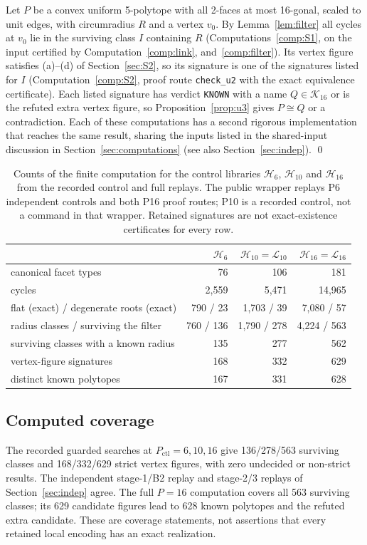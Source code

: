 \documentclass[11pt]{article}
\theoremstyle{definition}
\theoremstyle{remark}
\begin{document}
Let $P$ be a convex uniform 5-polytope with all 2-faces at most 16-gonal,
scaled to unit edges, with circumradius $R$ and a vertex $v_0$. By
Lemma~\ref{lem:filter} all cycles at $v_0$ lie in the surviving class $I$
containing $R$ (Computations~\ref{comp:S1}, on the input certified by
Computation~\ref{comp:link}, and~\ref{comp:filter}). Its vertex figure
satisfies (a)--(d) of Section~\ref{sec:S2}, so its signature is one of the
signatures listed for $I$ (Computation~\ref{comp:S2}, proof route
\texttt{check\_u2} with the exact equivalence certificate). Each listed
signature has verdict \texttt{KNOWN} with a name $Q\in\mathcal K_{16}$ or
is the refuted extra vertex figure, so Proposition~\ref{prop:u3} gives
$P\cong Q$ or a contradiction. Each of these computations
has a second rigorous implementation that reaches the same result, sharing
the inputs listed in the shared-input discussion in Section~\ref{sec:computations}
(see also Section~\ref{sec:indep}). \qed

\begin{table}[ht]
\centering\small
\caption{Counts of the finite computation for the control libraries
$\mathcal H_6$, $\mathcal H_{10}$ and $\mathcal H_{16}$
from the recorded control and full replays. The public wrapper replays
P6 independent controls and both P16 proof routes; P10 is a recorded
control, not a command in that wrapper. Retained signatures are not
exact-existence certificates for every row.}
\label{tab:counts}
\begin{tabular}{@{}lrrr@{}}
\toprule
 & $\mathcal H_6$ & $\mathcal H_{10}=\mathcal L_{10}$ & $\mathcal H_{16}=\mathcal L_{16}$\\
\midrule
canonical facet types & 76 & 106 & 181\\
cycles & 2,559 & 5,471 & 14,965\\
\quad flat (exact) / degenerate roots (exact) & 790 / 23 & 1,703 / 39 & 7,080 / 57\\
radius classes / surviving the filter & 760 / 136 & 1,790 / 278 & 4,224 / 563\\
surviving classes with a known radius & 135 & 277 & 562\\
vertex-figure signatures & 168 & 332 & 629\\
distinct known polytopes & 167 & 331 & 628\\
\bottomrule
\end{tabular}
\end{table}

\subsection{Computed coverage}
The recorded guarded searches at $P_{\mathrm{ctl}}=6,10,16$ give 136/278/563
surviving classes and 168/332/629 strict vertex figures, with zero
undecided or non-strict results. The independent stage-1/B2 replay and
stage-2/3 replays of Section~\ref{sec:indep} agree. The full $P=16$
computation covers all 563 surviving classes; its 629 candidate figures
lead to 628 known polytopes and the refuted extra candidate. These are
coverage statements, not assertions that every retained local encoding
has an exact realization.
\end{document}
